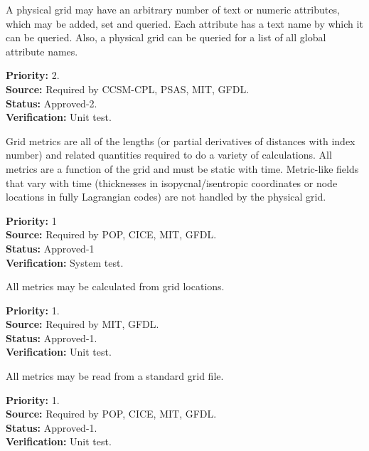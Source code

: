 A physical grid may have an arbitrary number of text or numeric attributes,
which may be added, set and queried.  Each attribute has a text name by which it
can be queried.  Also, a physical grid can be queried for a list of all global
attribute names.

\begin{reqlist}
{\bf Priority:} 2. \\
{\bf Source:} Required by CCSM-CPL, PSAS, MIT, GFDL. \\
{\bf Status:} Approved-2. \\
{\bf Verification:} Unit test.
\end{reqlist}

Grid metrics are all of the lengths (or partial derivatives of distances with
index number) and related quantities required to do a variety of calculations. 
All metrics are a function of the grid and must be static with time.  Metric-like
fields that vary with time (thicknesses in isopycnal/isentropic coordinates
or node locations in fully Lagrangian codes) are not handled by the physical grid.
\begin{reqlist}
{\bf Priority:} 1 \\
{\bf Source:} Required by POP, CICE, MIT, GFDL. \\
{\bf Status:} Approved-1 \\
{\bf Verification:} System test.
\end{reqlist}

All metrics may be calculated from grid locations.
\begin{reqlist}
{\bf Priority:} 1. \\
{\bf Source:} Required by MIT, GFDL.\\
{\bf Status:} Approved-1. \\
{\bf Verification:} Unit test.
\end{reqlist}

All metrics may be read from a standard grid file.
\begin{reqlist}
{\bf Priority:} 1. \\
{\bf Source:} Required by POP, CICE, MIT, GFDL. \\
{\bf Status:} Approved-1. \\
{\bf Verification:} Unit test. 
\end{reqlist}

